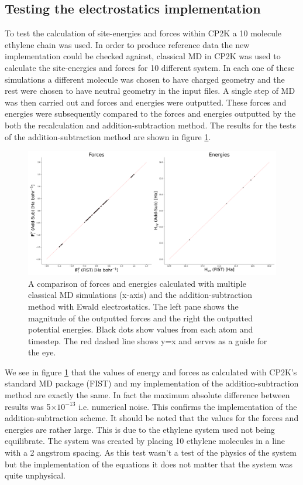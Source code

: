 \subsection{Testing the electrostatics implementation}
\label{sect:testESimp}
To test the calculation of site-energies and forces within CP2K a 10 molecule ethylene chain was used. In order to produce reference data the new implementation could be checked against, classical MD in CP2K was used to calculate the site-energies and forces for 10 different system. In each one of these simulations a different molecule was chosen to have charged geometry and the rest were chosen to have neutral geometry in the input files. A single step of MD was then carried out and forces and energies were outputted. These forces and energies were subsequently compared to the forces and energies outputted by the both the recalculation and addition-subtraction method. The results for the tests of the addition-subtraction method are shown in figure \ref{fig:AddSubEwaldTest}.
\begin{figure}[ht]
  \includegraphics[width=\textwidth]{../img/ES/10_mol_FIST.png}
  \caption{\label{fig:AddSubEwaldTest}A comparison of forces and energies calculated with multiple classical MD simulations (x-axis) and the addition-subtraction method with Ewald electrostatics. The left pane shows the magnitude of the outputted forces and the right the outputted potential energies. Black dots show values from each atom and timestep. The red dashed line shows y=x and serves as a guide for the eye.}
\end{figure}
We see in figure \ref{fig:AddSubEwaldTest} that the values of energy and forces as calculated with CP2K's standard MD package (FIST) and my implementation of the addition-subtraction method are exactly the same. In fact the maximum absolute difference between results was 5$\times 10^{-13}$ i.e. numerical noise. This confirms the implementation of the addition-subtraction scheme. It should be noted that the values for the forces and energies are rather large. This is due to the ethylene system used not being equilibrate. The system was created by placing 10 ethylene molecules in a line with a 2 angstrom spacing. As this test wasn't a test of the physics of the system but the implementation of the equations it does not matter that the system was quite unphysical.
